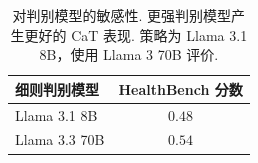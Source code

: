 \begin{longtable}{lc}
\caption{对判别模型的敏感性. 更强判别模型产生更好的 CaT 表现. 策略为 Llama 3.1 8B，使用 Llama 3 70B 评价.}\label{cat-tab:judge-sensitivity}\\

        \toprule
        \textbf{细则判别模型} & \textbf{HealthBench 分数} \\
        \midrule
        Llama 3.1 8B & $0.48$ \\
        Llama 3.3 70B & $0.54$ \\
        \bottomrule
    
\end{longtable}
